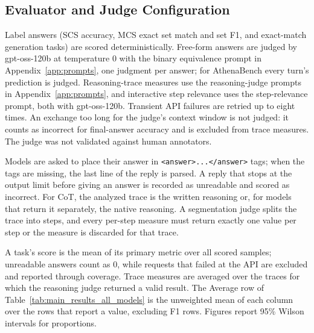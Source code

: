 \subsection{Evaluator and Judge Configuration}
\label{app:evaluator_configuration}

Label answers (SCS accuracy, MCS exact set match and set F1, and exact-match generation tasks) are scored deterministically. Free-form answers are judged by gpt-oss-120b at temperature 0 with the binary equivalence prompt in Appendix~\ref{app:prompts}, one judgment per answer; for AthenaBench every turn's prediction is judged. Reasoning-trace measures use the reasoning-judge prompts in Appendix~\ref{app:prompts}, and interactive step relevance uses the step-relevance prompt, both with gpt-oss-120b. Transient API failures are retried up to eight times. An exchange too long for the judge's context window is not judged: it counts as incorrect for final-answer accuracy and is excluded from trace measures. The judge was not validated against human annotators.


Models are asked to place their answer in \texttt{<answer>...</answer>} tags; when the tags are missing, the last line of the reply is parsed. A reply that stops at the output limit before giving an answer is recorded as unreadable and scored as incorrect. For CoT, the analyzed trace is the written reasoning or, for models that return it separately, the native reasoning. A segmentation judge splits the trace into steps, and every per-step measure must return exactly one value per step or the measure is discarded for that trace.

A task's score is the mean of its primary metric over all scored samples; unreadable answers count as 0, while requests that failed at the API are excluded and reported through coverage. Trace measures are averaged over the traces for which the reasoning judge returned a valid result. The Average row of Table~\ref{tab:main_results_all_models} is the unweighted mean of each column over the rows that report a value, excluding F1 rows. Figures report 95\% Wilson intervals for proportions.


